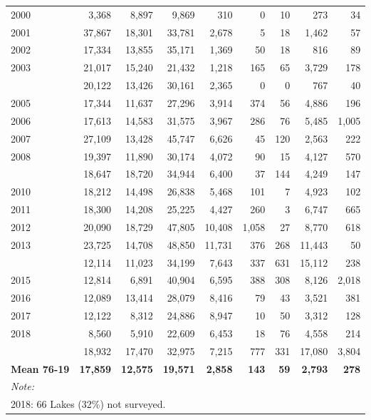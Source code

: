 \documentclass[
]{article}
\begin{document}
\begin{table}
\begin{tabular}[t]{lrrrrrrrr}
2000 & 3,368 & 8,897 & 9,869 & 310 & 0 & 10 & 273 & 34\\
2001 & 37,867 & 18,301 & 33,781 & 2,678 & 5 & 18 & 1,462 & 57\\
2002 & 17,334 & 13,855 & 35,171 & 1,369 & 50 & 18 & 816 & 89\\
2003 & 21,017 & 15,240 & 21,432 & 1,218 & 165 & 65 & 3,729 & 178\\
\addlinespace
2004 & 20,122 & 13,426 & 30,161 & 2,365 & 0 & 0 & 767 & 40\\
2005 & 17,344 & 11,637 & 27,296 & 3,914 & 374 & 56 & 4,886 & 196\\
2006 & 17,613 & 14,583 & 31,575 & 3,967 & 286 & 76 & 5,485 & 1,005\\
2007 & 27,109 & 13,428 & 45,747 & 6,626 & 45 & 120 & 2,563 & 222\\
2008 & 19,397 & 11,890 & 30,174 & 4,072 & 90 & 15 & 4,127 & 570\\
\addlinespace
2009 & 18,647 & 18,720 & 34,944 & 6,400 & 37 & 144 & 4,249 & 147\\
2010 & 18,212 & 14,498 & 26,838 & 5,468 & 101 & 7 & 4,923 & 102\\
2011 & 18,300 & 14,208 & 25,225 & 4,427 & 260 & 3 & 6,747 & 665\\
2012 & 20,090 & 18,729 & 47,805 & 10,408 & 1,058 & 27 & 8,770 & 618\\
2013 & 23,725 & 14,708 & 48,850 & 11,731 & 376 & 268 & 11,443 & 50\\
\addlinespace
2014 & 12,114 & 11,023 & 34,199 & 7,643 & 337 & 631 & 15,112 & 238\\
2015 & 12,814 & 6,891 & 40,904 & 6,595 & 388 & 308 & 8,126 & 2,018\\
2016 & 12,089 & 13,414 & 28,079 & 8,416 & 79 & 43 & 3,521 & 381\\
2017 & 12,122 & 8,312 & 24,886 & 8,947 & 10 & 50 & 3,312 & 128\\
2018 & 8,560 & 5,910 & 22,609 & 6,453 & 18 & 76 & 4,558 & 214\\
\addlinespace
2019 & 18,932 & 17,470 & 32,975 & 7,215 & 777 & 331 & 17,080 & 3,804\\
\rowcolor{cyan}  \textbf{Mean 76-19} & \textbf{17,859} & \textbf{12,575} & \textbf{19,571} & \textbf{2,858} & \textbf{143} & \textbf{59} & \textbf{2,793} & \textbf{278}\\
\bottomrule
\multicolumn{9}{l}{\textit{Note: }}\\
\multicolumn{9}{l}{2018: 66 Lakes (32\%) not surveyed.}\\
\end{tabular}
\end{table}
\end{document}
